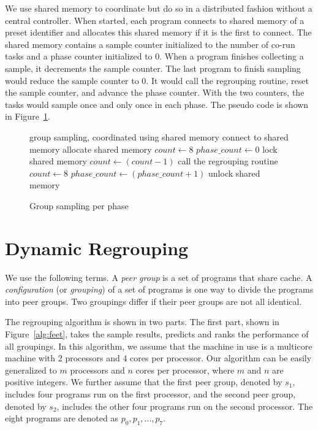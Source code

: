 We use shared memory to coordinate but do so in a distributed fashion
without a central controller.  When started, each program connects to
shared memory of a preset identifier and allocates this shared memory
if it is the first to connect.  The shared memory contains a sample
counter initialized to the number of co-run tasks and a phase counter
initialized to 0.  When a program finishes collecting a sample, it
decrements the sample counter.  The last program to finish sampling
would reduce the sample counter to 0.  It would call the regrouping
routine, reset the sample counter, and advance the phase counter.
With the two counters, the tasks would sample once and only once in
each phase.  The pseudo code is shown in Figure~\ref{alg:phase_control}.

\medskip
\begin{figure}[h!]
 \centering
 \small
 \begin{minipage}{\linewidth}
   \begin{algorithmic}[1]
     \REQUIRE group sampling, coordinated using shared memory
     \STATE {}
     \STATE connect to shared memory
        \STATE allocate shared memory
        \STATE $count \gets 8$
        \STATE $phase\_count \gets 0$
     \ENDIF
     \STATE {}
     \STATE lock shared memory
     \STATE $count \gets (count - 1)$
         \STATE call the regrouping routine
         \STATE $count \gets 8$
         \STATE $phase\_count \gets (phase\_count+1)$
     \ENDIF
     \STATE unlock shared memory
   \end{algorithmic}
   \caption{Group sampling per phase}
   \label{alg:phase_control}
 \end{minipage}
\end{figure}

\section{Dynamic Regrouping}

We use the following terms.  A \emph{peer group} is a set of programs
that share cache.  A \emph{configuration} (or \emph{grouping}) of a
set of programs is one way to divide the programs into peer groups.
Two groupings differ if their peer groups are not all identical.

The regrouping algorithm is shown in two parts. The first part, shown in
Figure~\ref{alg:feet}, takes the sample results, predicts and ranks
the performance of all groupings. In this algorithm, we assume that
the machine in use is a multicore machine with 2 processors and 4
cores per processor. Our algorithm can be easily generalized to $m$
processors and $n$ cores per processor, where $m$ and $n$ are positive
integers. We further assume that the first peer group, denoted by
$s_1$, includes four programs run on the first processor, and the
second peer group, denoted by $s_2$, includes the other four programs
run on the second processor. The eight programs are denoted as $p_0, p_1, ..., p_7$. 

